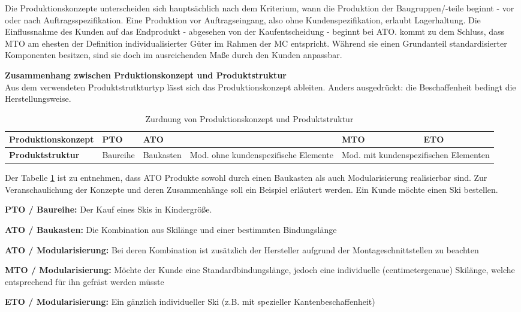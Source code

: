 \documentclass[12pt,a4paper,bibliography=totocnumbered,listof=totoc]{scrartcl}
\begin{document}
Die Produktionskonzepte unterscheiden sich hauptsächlich nach dem Kriterium, wann die Produktion der Baugruppen/-teile beginnt - vor oder nach Auftragsspezifikation. Eine Produktion vor Auftragseingang, also ohne Kundenspezifikation, erlaubt Lagerhaltung. Die Einflussnahme des Kunden auf das Endprodukt - abgesehen von der Kaufentscheidung - beginnt bei \ac{ATO}. \citeauthor{lutz11} kommt zu dem Schluss, dass \ac{MTO} am ehesten der Definition individualisierter Güter im Rahmen der \ac{MC} entspricht. Während sie einen Grundanteil standardisierter Komponenten besitzen, sind sie doch im ausreichenden Maße durch den Kunden anpassbar.

\textbf{Zusammenhang zwischen Prduktionskonzept und Produktstruktur}\\
Aus dem verwendeten Produktstrutkturtyp lässt sich das Produktionskonzept ableiten. Anders ausgedrückt: die Beschaffenheit bedingt die Herstellungsweise.

\begin{table}[]
\centering
\caption{Zurdnung von Produktionskonzept und Produktstruktur}
\label{tab:produktionskonzeptstruktur}
\begin{tabularx}{\textwidth}{|l|X|X|X|X|X|}
   \hline
{\bf Produktionskonzept} & PTO & \multicolumn{2}{|X|}{ATO}                                                                             & MTO & ETO\\
	\hline
{\bf Produktstruktur}    & Baureihe & Baukasten & Mod. ohne kundenspezifische Elemente & \multicolumn{2}{|X|}{Mod. mit kundenspezifischen Elementen} \\
   \hline
\end{tabularx}
\end{table}

Der Tabelle \ref{tab:produktionskonzeptstruktur} ist zu entnehmen, dass \ac{ATO} Produkte sowohl durch einen Baukasten als auch Modularisierung realisierbar sind.
Zur Veranschaulichung der Konzepte und deren Zusammenhänge soll ein Beispiel erläutert werden. Ein Kunde möchte einen Ski bestellen.

\begin{compactitem}
\item \textbf{\ac{PTO} / Baureihe:} Der Kauf eines Skis in Kindergröße.
\item \textbf{\ac{ATO} / Baukasten:} Die Kombination aus Skilänge und einer bestimmten Bindungslänge
\item \textbf{\ac{ATO} / Modularisierung:} Bei deren Kombination ist zusätzlich der Hersteller aufgrund der Montageschnittstellen zu beachten
\item \textbf{\ac{MTO} / Modularisierung:} Möchte der Kunde eine Standardbindungslänge, jedoch eine individuelle (centimetergenaue) Skilänge, welche entsprechend für ihn gefräst werden müsste
\item \textbf{\ac{ETO} / Modularisierung:} Ein gänzlich individueller Ski (z.B. mit spezieller Kantenbeschaffenheit)
\end{compactitem}
\end{document}
